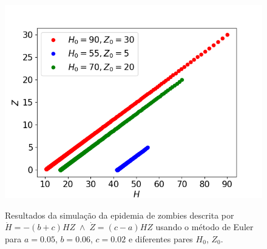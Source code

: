 \documentclass[aps,pre,twocolumn,showpacs,amsmath,amssymb]{revtex4-1}
\begin{document}
\begin{figure}[hbt!]
   \begin{center}
    \includegraphics[width=\columnwidth]{epidemiazombieeuler.png} \\
\caption{Resultados da simulação da epidemia de zombies descrita por     $\dot H=-(b+c)HZ\; \wedge \;\dot Z=(c-a)HZ$ usando o método de Euler para $a=0.05$, $b=0.06$, $c=0.02$ e diferentes pares $H_0$, $Z_0$.}
  \label{epidemiaeuler}
   \end{center}
  \end{figure}
\end{document}
